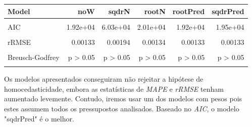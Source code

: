 \documentclass[justified, 11pt]{scrartcl}\usepackage[]{graphicx}\usepackage[]{xcolor}
\newenvironment{knitrout}{}{} %
\begin{document}
\begin{knitrout}
\begin{table}
\begin{tabular}{l|r|r|r|r|r}
\hline
Model & noW & sqdrN & rootN & rootPred & sqdrPred\\
\hline
\cellcolor{gray!6}{R2} & \cellcolor{gray!6}{0.412} & \cellcolor{gray!6}{0.976} & \cellcolor{gray!6}{0.371} & \cellcolor{gray!6}{0.419} & \cellcolor{gray!6}{0.444}\\
\hline
AIC & 1.92e+04 & 6.03e+04 & 2.01e+04 & 1.92e+04 & 1.95e+04\\
\hline
\cellcolor{gray!6}{MAPE} & \cellcolor{gray!6}{0.0859} & \cellcolor{gray!6}{0.137} & \cellcolor{gray!6}{0.0879} & \cellcolor{gray!6}{0.0859} & \cellcolor{gray!6}{0.0863}\\
\hline
rRMSE & 0.00133 & 0.00194 & 0.00134 & 0.00133 & 0.00133\\
\hline
\cellcolor{gray!6}{Breusch-Pagan} & \cellcolor{gray!6}{p = 2.01e-117} & \cellcolor{gray!6}{p > 0.05} & \cellcolor{gray!6}{p > 0.05} & \cellcolor{gray!6}{p = 5.11e-60} & \cellcolor{gray!6}{p > 0.05}\\
\hline
Breusch-Godfrey & p > 0.05 & p > 0.05 & p > 0.05 & p > 0.05 & p > 0.05\\
\hline
\cellcolor{gray!6}{Jarque-Bera} & \cellcolor{gray!6}{p < 0.05} & \cellcolor{gray!6}{p < 0.05} & \cellcolor{gray!6}{p < 0.05} & \cellcolor{gray!6}{p < 0.05} & \cellcolor{gray!6}{p < 0.05}\\
\hline
\end{tabular}
\endgroup{}
\end{table}

\end{knitrout}

Os modelos apresentados conseguiram não rejeitar a hipótese de homocedasticidade, embora as estatísticas de \textit{MAPE} e \textit{rRMSE} tenham aumentado levemente. Contudo, iremos usar um dos modelos com pesos pois estes assumem todos os pressupostos analisados. Baseado no \textit{AIC}, o modelo "sqdrPred" é o melhor.\\
\end{document}
